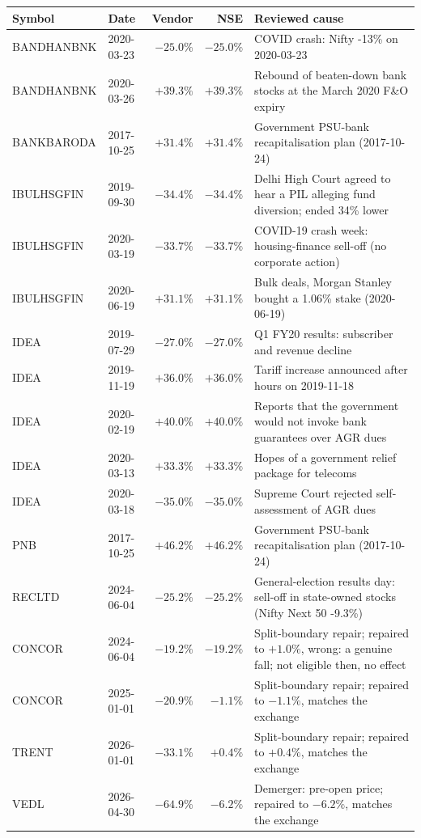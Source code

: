 \begin{tabular}{llrr>{\raggedright\arraybackslash}p{7.6cm}}
\toprule
Symbol & Date & Vendor & NSE & Reviewed cause \\
\midrule
BANDHANBNK & 2020-03-23 & $-25.0\%$ & $-25.0\%$ & COVID crash: Nifty -13\% on 2020-03-23 \\
BANDHANBNK & 2020-03-26 & $+39.3\%$ & $+39.3\%$ & Rebound of beaten-down bank stocks at the March 2020 F\&O expiry \\
BANKBARODA & 2017-10-25 & $+31.4\%$ & $+31.4\%$ & Government PSU-bank recapitalisation plan (2017-10-24) \\
IBULHSGFIN & 2019-09-30 & $-34.4\%$ & $-34.4\%$ & Delhi High Court agreed to hear a PIL alleging fund diversion; ended 34\% lower \\
IBULHSGFIN & 2020-03-19 & $-33.7\%$ & $-33.7\%$ & COVID-19 crash week: housing-finance sell-off (no corporate action) \\
IBULHSGFIN & 2020-06-19 & $+31.1\%$ & $+31.1\%$ & Bulk deals, Morgan Stanley bought a 1.06\% stake (2020-06-19) \\
IDEA & 2019-07-29 & $-27.0\%$ & $-27.0\%$ & Q1 FY20 results: subscriber and revenue decline \\
IDEA & 2019-11-19 & $+36.0\%$ & $+36.0\%$ & Tariff increase announced after hours on 2019-11-18 \\
IDEA & 2020-02-19 & $+40.0\%$ & $+40.0\%$ & Reports that the government would not invoke bank guarantees over AGR dues \\
IDEA & 2020-03-13 & $+33.3\%$ & $+33.3\%$ & Hopes of a government relief package for telecoms \\
IDEA & 2020-03-18 & $-35.0\%$ & $-35.0\%$ & Supreme Court rejected self-assessment of AGR dues \\
PNB & 2017-10-25 & $+46.2\%$ & $+46.2\%$ & Government PSU-bank recapitalisation plan (2017-10-24) \\
RECLTD & 2024-06-04 & $-25.2\%$ & $-25.2\%$ & General-election results day: sell-off in state-owned stocks (Nifty Next 50 -9.3\%) \\
\midrule
CONCOR & 2024-06-04 & $-19.2\%$ & $-19.2\%$ & Split-boundary repair; repaired to $+1.0\%$, wrong: a genuine fall; not eligible then, no effect \\
CONCOR & 2025-01-01 & $-20.9\%$ & $-1.1\%$ & Split-boundary repair; repaired to $-1.1\%$, matches the exchange \\
TRENT & 2026-01-01 & $-33.1\%$ & $+0.4\%$ & Split-boundary repair; repaired to $+0.4\%$, matches the exchange \\
VEDL & 2026-04-30 & $-64.9\%$ & $-6.2\%$ & Demerger: pre-open price; repaired to $-6.2\%$, matches the exchange \\
\bottomrule
\end{tabular}
